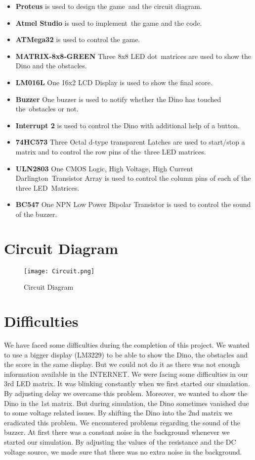 \documentclass[a4paper]{article}
\begin{document}
\begin{itemize}
	\item \textbf{Proteus} is used to design the game and the circuit diagram.
    \item \textbf{Atmel Studio} is used to implement the game and the code.
	\item \textbf{ATMega32} is used to control the game.
	\item \textbf{MATRIX-8x8-GREEN} Three 8x8 LED dot matrices are used to show the Dino and the obstacles. 
	\item \textbf{LM016L} One 16x2 LCD Display is used to show the final score.
	\item \textbf{Buzzer} One buzzer is used to notify whether the Dino has touched the obstacles or not.
	\item \textbf{Interrupt 2} is used to control the Dino with additional help of a button.
	\item \textbf{74HC573} Three Octal d-type transparent Latches are used to start/stop a matrix and to control the row pins of the three LED matrices.
	\item \textbf{ULN2803} One CMOS Logic, High Voltage, High Current Darlington Transistor Array is used to control the column pins of each of the three LED Matrices.
	\item \textbf{BC547} One NPN Low Power Bipolar Transistor is used to control the sound of the buzzer. 
	
\end{itemize}

\section{Circuit Diagram}

\begin{figure}[h]
	\centering
	\texttt{[image: Circuit.png]}
	\label{fig:1}
	\caption{Circuit Diagram}
\end{figure}
 
\section{Difficulties}

We have faced some difficulties during the completion of this project. We wanted to use a bigger display (LM3229) to be able to show the Dino, the obstacles and the score in the same display. But we could not do it as there was not enough information available in the INTERNET. We were facing some difficulties in our 3rd LED matrix. It was blinking constantly when we first started our simulation. By adjusting delay we overcame this problem. Moreover, we wanted to show the Dino in the 1st matrix. But during simulation, the Dino sometimes vanished due to some voltage related issues. By shifting the Dino into the 2nd matrix we eradicated this problem. We encountered problems regarding the sound of the buzzer. At first there was a constant noise in the background whenever we started our simulation. By adjusting the values of the resistance and the DC voltage source, we made sure that there was no extra noise in the background.
\end{document}

